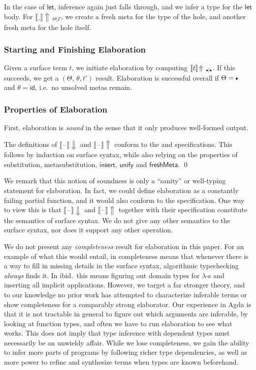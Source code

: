 \documentclass[acmsmall,screen,dvipsnames]{acmart}\settopmatter{}
\newcommand{\slet}{\boldsymbol{\mathsf{let}}}
\newcommand{\emptycon}{\scaleobj{.75}\bullet}
\newcommand{\id}{\mathsf{id}}
\newcommand{\blank}{\mathord{\hspace{1pt}\text{--}\hspace{1pt}}}
\newcommand{\unify}{\mathsf{unify}}
\newcommand{\echeckblank}{\llbracket\blank\rrbracket\!\Downarrow}
\newcommand{\einferblank}{\llbracket\blank\rrbracket\!\Uparrow}
\newcommand{\einfer}[3]{\llbracket#1\rrbracket\!\Uparrow\,_{#2|#3}}
\theoremstyle{remark}
\begin{document}
In the case of $\slet$, inference again just falls through, and we infer a type
for the $\slet$ body. For $\einfer{\_}{\Theta}{\Gamma}$, we create a fresh meta
for the type of the hole, and another fresh meta for the hole itself.

\subsubsection{Starting and Finishing Elaboration} Given a surface term $t$,
we initiate elaboration by computing $\einfer{t}{\emptycon}{\emptycon}$. If this
succeeds, we get a $(\Theta,\,\theta,t')$ result. Elaboration is successful overall
if $\Theta = \emptycon$ and $\theta = \id$, i.e.\ no unsolved metas remain.

\subsubsection{Properties of Elaboration}
First, elaboration is \emph{sound} in the sense that it only produces well-formed
output.

\begin{theorem}[Soundness] The definitions of $\echeckblank$ and
$\einferblank$ conform to the  and 
  specifications. This follows by induction on surface syntax, while also
  relying on the properties of substitution, metasubstitution,
  $\mathsf{insert}$, $\unify$ and $\mathsf{freshMeta}$. \qed
\end{theorem}

We remark that this notion of soundness is only a ``sanity'' or well-typing
statement for elaboration. In fact, we could define elaboration as a constantly
failing partial function, and it would also conform to the specification. One
way to view this is that $\echeckblank$ and $\einferblank$ together with their
specification constitute the semantics of surface syntax. We do not give any
other semantics to the surface syntax, nor does it support any other operation.

We do not present any \emph{completeness} result for elaboration in this
paper. For an example of what this would entail, in \cite{dunfield2013complete}
completeness means that whenever there is a way to fill in missing details in
the surface syntax, algorithmic typechecking \emph{always} finds it. In
ibid.\ this means figuring out domain types for $\lambda$-s and inserting all
implicit applications. However, we target a far stronger theory, and to our
knowledge no prior work has attempted to characterize inferable terms or show
completeness for a comparably strong elaborator. Our experience in Agda is that
it is not tractable in general to figure out which arguments are inferable, by
looking at function types, and often we have to run elaboration to see what
works. This does not imply that type inference with dependent types must
necessarily be an unwieldy affair. While we lose completeness, we gain the
ability to infer more parts of programs by following richer type dependencies,
as well as more power to refine and synthesize terms when types are known
beforehand.
\end{document}
